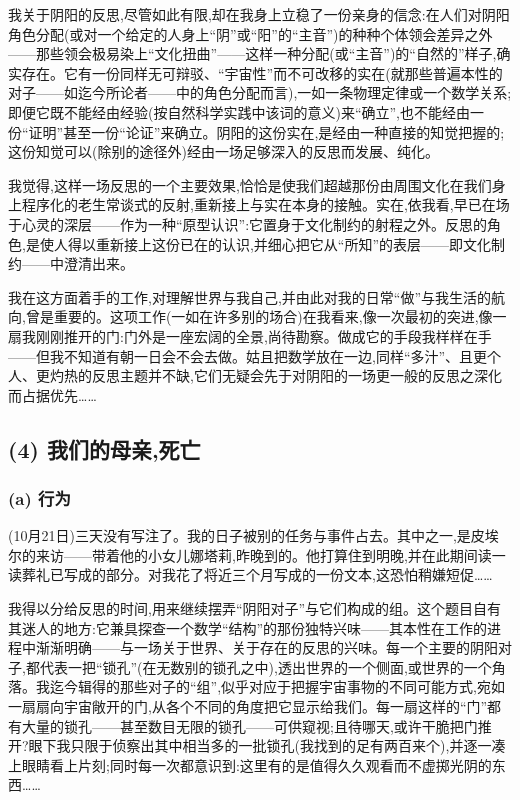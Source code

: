 我关于阴阳的反思,尽管如此有限,却在我身上立稳了一份亲身的信念:在人们对阴阳角色分配(或对一个给定的人身上“阴”或“阳”的“主音”)的种种个体领会差异之外——那些领会极易染上“文化扭曲”——这样一种分配(或“主音”)的“自然的”样子,确实存在。它有一份同样无可辩驳、“宇宙性”而不可改移的实在(就那些普遍本性的对子——如迄今所论者——中的角色分配而言),一如一条物理定律或一个数学关系;即便它既不能经由经验(按自然科学实践中该词的意义)来“确立”,也不能经由一份“证明”甚至一份“论证”来确立。\dmark{}阴阳的这份实在,是经由一种直接的知觉把握的;这份知觉可以(除别的途径外)经由一场足够深入的反思而发展、纯化。

我觉得,这样一场反思的一个主要效果,恰恰是使我们超越那份由周围文化在我们身上程序化的老生常谈式的反射,重新接上与实在本身的接触。实在,依我看,早已在场于心灵的深层——作为一种“原型认识”:它置身于文化制约的射程之外。反思的角色,是使人得以重新接上这份已在的认识,并细心把它从“所知”的表层——即文化制约——中澄清出来。

我在这方面着手的工作,对理解世界与我自己,并由此对我的日常“做”与我生活的航向,曾是重要的。这项工作(一如在许多别的场合)在我看来,像一次最初的突进,像一扇我刚刚推开的门:门外是一座宏阔的全景,尚待勘察。做成它的手段我样样在手——但我不知道有朝一日会不会去做。姑且把数学放在一边,同样“多汁”、且更个人、更灼热的反思主题并不缺,它们无疑会先于对阴阳的一场更一般的反思之深化而占据优先……

\subsection{(4) 我们的母亲,死亡}
\label{ch18:local:h16}

\subsubsection*{(a) 行为}
\label{ch18:local:h17}

\label{ch18:local:n15}

(10月21日)三天没有写注了。我的日子被别的任务与事件占去。其中之一,是皮埃尔的来访——带着他的小女儿娜塔莉,昨晚到的。他打算住到明晚,并在此期间读一读葬礼已写成的部分。对我花了将近三个月写成的一份文本,这恐怕稍嫌短促……

我得以分给反思的时间,用来继续\dmark{}摆弄“阴阳对子”与它们构成的组。这个题目自有其迷人的地方:它兼具探查一个数学“结构”的那份独特兴味——其本性在工作的进程中渐渐明确——与一场关于世界、关于存在的反思的兴味。每一个主要的阴阳对子,都代表一把“锁孔”(在无数别的锁孔之中),透出世界的一个侧面,或世界的一个角落。我迄今辑得的那些对子的“组”,似乎对应于把握宇宙事物的不同可能方式,宛如一扇扇向宇宙敞开的门,从各个不同的角度把它显示给我们。每一扇这样的“门”都有大量的锁孔——甚至数目无限的锁孔——可供窥视;且待哪天,或许干脆把门推开?眼下我只限于侦察出其中相当多的一批锁孔(我找到的足有两百来个),并逐一凑上眼睛看上片刻;同时每一次都意识到:这里有的是值得久久观看而不虚掷光阴的东西……

